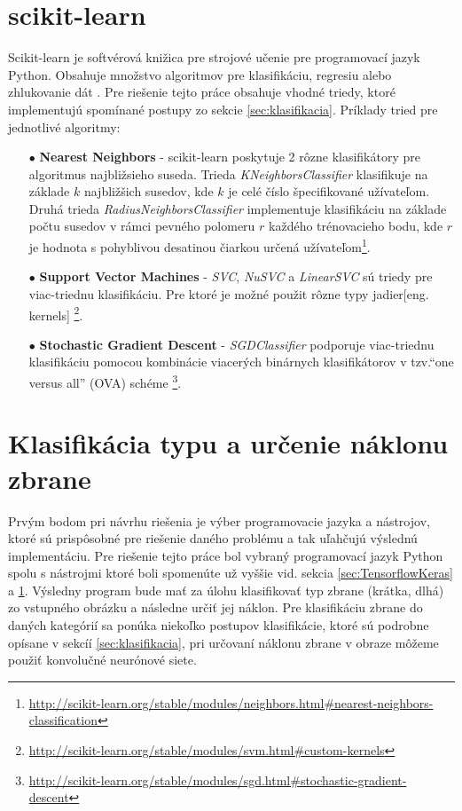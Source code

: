 \section{scikit-learn}
\label{sec:scikitlearn}

Scikit-learn je softvérová knižica pre strojové učenie pre programovací jazyk Python.
Obsahuje množstvo algoritmov pre klasifikáciu, regresiu alebo zhlukovanie dát \cite{odkaz:scikitlearn}.
Pre riešenie tejto práce obsahuje vhodné triedy, ktoré implementujú spomínané postupy zo sekcie \ref{sec:klasifikacia}.
Príklady tried pre jednotlivé algoritmy:
\begin{enumerate}
    \item[$\bullet$] \textbf{Nearest Neighbors} - scikit-learn poskytuje 2 rôzne klasifikátory pre algoritmus najbližsieho suseda.
    Trieda \textit{KNeighborsClassifier} klasifikuje na základe $k$ najbližšich susedov, kde $k$ je celé číslo špecifikované užívateľom.
    Druhá trieda \textit{RadiusNeighborsClassifier} implementuje klasifikáciu na základe počtu susedov v rámci pevného polomeru $r$ každého trénovacieho bodu,
    kde $r$ je hodnota s pohyblivou desatinou čiarkou určená užívateľom\footnote{\url{http://scikit-learn.org/stable/modules/neighbors.html\#nearest-neighbors-classification}}.
    \item[$\bullet$] \textbf{Support Vector Machines} - \textit{SVC}, \textit{NuSVC} a \textit{LinearSVC} sú triedy pre viac-triednu klasifikáciu.
    Pre ktoré je možné použit rôzne typy jadier[eng. kernels] \footnote{\url{http://scikit-learn.org/stable/modules/svm.html\#custom-kernels}}.
    \item[$\bullet$] \textbf{Stochastic Gradient Descent} - \textit{SGDClassifier} podporuje viac-triednu klasifikáciu pomocou kombinácie viacerých binárnych klasifikátorov v tzv.“one versus all” (OVA) schéme \footnote{\url{http://scikit-learn.org/stable/modules/sgd.html\#stochastic-gradient-descent}}.
\end{enumerate}


\section{Klasifikácia typu a určenie náklonu zbrane}
Prvým bodom pri návrhu riešenia je výber programovacie jazyka a nástrojov, ktoré sú prispôsobné pre riešenie daného problému a tak uľahčujú výslednú implementáciu.
Pre riešenie tejto práce bol vybraný programovací jazyk Python spolu s nástrojmi ktoré boli spomenúte už vyššie vid. sekcia \ref{sec:TensorflowKeras} a \ref{sec:scikitlearn}.
Výsledny program bude mať za úlohu klasifikovať typ zbrane (krátka, dlhá) zo vstupného obrázku a následne určiť jej náklon.
Pre klasifikáciu zbrane do daných kategórií sa ponúka niekoľko postupov klasifikácie, ktoré sú podrobne opísane v sekcíí \ref{sec:klasifikacia},
    pri určovaní náklonu zbrane v obraze môžeme použiť konvolučné neurónové siete.
